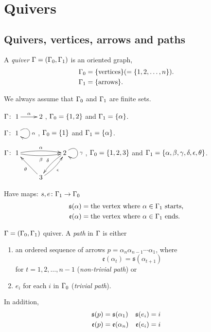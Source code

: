 \section{Quivers}
\subsection{Quivers, vertices, arrows and paths}
\begin{defin}
A \emph{quiver} $\Gamma = (\Gamma_0,\Gamma_1)$ is an oriented graph,
\begin{align}
\G_0 & = \{\text{vertices}\index{quiver!vertices}\}  (= \{1,2,\ldots,n\}).\notag\\
\G_1 & = \{\text{arrows}\index{quiver!arrows}\}.\notag
\end{align}
\end{defin}
We always assume that $\Gamma_0$ and $\Gamma_1$ are finite sets.

\begin{exam}
$\G\colon \xymatrix{1\ar[r]^\alpha & 2}$, $\Gamma_0=\{1,2\}$ and $\Gamma_1=\{\alpha\}$. 
\end{exam}

\begin{exam}
$\G\colon \xymatrix{1\ar@(ur,dr)[]^\alpha}$, $\Gamma_0=\{1\}$ and $\Gamma_1=\{\alpha\}$. 
\end{exam}

\begin{exam} $\G\colon
  \xymatrix{1\ar@/^.3pc/[rr]^\alpha\ar@/_.3pc/[rr]_\beta & & 2\ar@(ur,dr)[]^\gamma\ar@/_0.3pc/[dl]_\delta\\
    & 3\ar[ul]^\theta\ar@/_0.3pc/[ur]_\epsilon & }$, $\Gamma_0=\{1,2,3\}$ and $\Gamma_1=\{\alpha,\beta,\gamma,\delta,\epsilon, \theta\}$.  
\end{exam}
Have maps: $s, e\colon \Gamma_1\to \Gamma_0$
\begin{align}
\mathfrak{s}(\alpha) & = \text{the vertex where $\alpha\in\G_1$ starts,}\notag\index{$\mathfrak{s}$}\\
\mathfrak{e}(\alpha) & = \text{the vertex where $\alpha\in\G_1$ ends.}\notag\index{$\mathfrak{e}$}
\end{align}

\begin{defin}
$\Gamma=(\Gamma_0,\Gamma_1)$ quiver.  A \emph{path} in $\Gamma$ is either
\begin{enumerate}[\rm(i)]
\item an ordered sequence of arrows $p=\alpha_n\alpha_{n-1}\cdots\alpha_1$, where 
\[\mathfrak{e}(\alpha_t) = \mathfrak{s}(\alpha_{t+1})\]
for $t = 1,2,\ldots,n-1$ (\emph{non-trivial path}) or
\item $e_i$ for each $i$ in $\Gamma_0$ (\emph{trivial path}).
\end{enumerate}
In addition,
\begin{align}
\mathfrak{s}(p) & = \mathfrak{s}(\alpha_1)  & \mathfrak{s}(e_i) = i\notag\\
\mathfrak{e}(p) & = \mathfrak{e}(\alpha_n)  & \mathfrak{e}(e_i) = i\notag
\end{align}
\end{defin}


